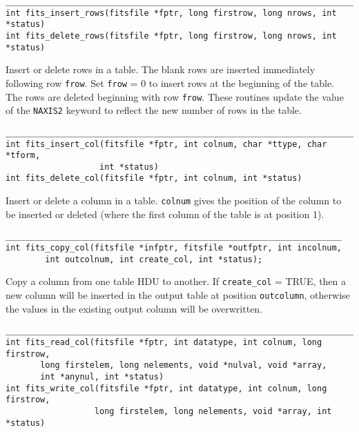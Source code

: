 \documentclass[11pt]{article}
\begin{document}
\begin{verbatim}
____________________________________________________________________________
int fits_insert_rows(fitsfile *fptr, long firstrow, long nrows, int *status)
int fits_delete_rows(fitsfile *fptr, long firstrow, long nrows, int *status)
\end{verbatim}

Insert or delete rows in a table.
The blank rows are
inserted immediately following row {\tt frow}. Set {\tt frow} = 0 to
insert rows at the beginning of the table.  The rows
are deleted beginning with row {\tt frow}.  These routines update the
value of the {\tt NAXIS2} keyword to reflect the new number of rows in
the table.

\begin{verbatim}
_________________________________________________________________________
int fits_insert_col(fitsfile *fptr, int colnum, char *ttype, char *tform,
                   int *status)
int fits_delete_col(fitsfile *fptr, int colnum, int *status)
\end{verbatim}

Insert or delete a column in a table.  {\tt colnum} gives the position of the
column to be inserted or deleted (where the first column of the table is 
at position 1).

\begin{verbatim}
____________________________________________________________________
int fits_copy_col(fitsfile *infptr, fitsfile *outfptr, int incolnum,
        int outcolnum, int create_col, int *status);
\end{verbatim}

Copy a column from one table HDU to another.  If {\tt create\_col} = TRUE,
then a new column will be inserted in the output table at position
{\tt outcolumn}, otherwise the values in the existing output column will be
overwritten. 

\begin{verbatim}
__________________________________________________________________________
int fits_read_col(fitsfile *fptr, int datatype, int colnum, long firstrow,
       long firstelem, long nelements, void *nulval, void *array, 
       int *anynul, int *status)
int fits_write_col(fitsfile *fptr, int datatype, int colnum, long firstrow,
                  long firstelem, long nelements, void *array, int *status)
\end{verbatim}
\end{document}
